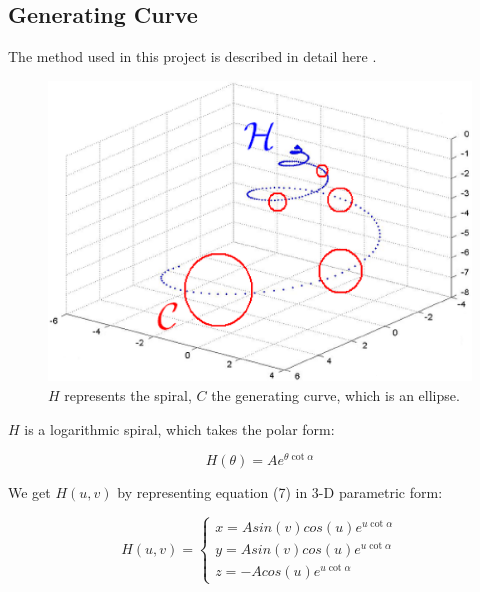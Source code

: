 \documentclass[a4paper]{article}
\begin{document}
\subsection{Generating Curve} 

The method used in this project is described in detail here \cite{JORGEPICADO}.

\begin{figure}[h]
	\centering\includegraphics[scale=0.5]{./img/generating_curve.png}
	\caption{$H$ represents the spiral, $C$ the generating curve, which is an ellipse. \cite{JORGEPICADO}}
	\label{3d-printed-torus} %
\end{figure}

$H$ is a logarithmic spiral, which takes the polar form:

\begin{equation}
	H(\theta) = Ae^{\theta \cot \alpha}
\end{equation}

We get $H(u, v)$ by representing equation (7) in 3-D parametric form:

\begin{equation}
	H(u, v) = 
	\begin{cases}
		x = A sin(v) cos(u) e^{u \cot \alpha}\\
		y = A sin(v) cos (u) e ^{u \cot \alpha}\\
		z = -A cos(u) e^{u \cot \alpha}
	\end{cases}
\end{equation}
\end{document}
